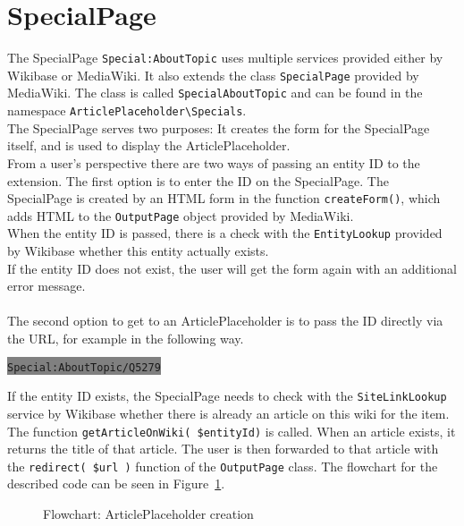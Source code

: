 \section{SpecialPage}

The SpecialPage \texttt{\justify Special:AboutTopic} uses multiple services provided either by Wikibase or MediaWiki. It also extends the class \texttt{\justify SpecialPage} provided by MediaWiki. The class is called \texttt{\justify SpecialAboutTopic} and can be found in the namespace \texttt{\justify ArticlePlaceholder\textbackslash{}Specials}. \\
The SpecialPage serves two purposes: It creates the form for the SpecialPage itself, and is used to display the ArticlePlaceholder. \\
From a user's perspective there are two ways of passing an entity ID to the extension. 
The first option is to enter the ID on the SpecialPage. The SpecialPage is created by an HTML form in the function \texttt{\justify createForm()}, which adds HTML to the \texttt{\justify OutputPage} object provided by MediaWiki. \\
When the entity ID is passed, there is a check with the \texttt{\justify EntityLookup} provided by Wikibase whether this entity actually exists. \\ 
If the entity ID does not exist, the user will get the form again with an additional error message. \\
\\
The second option to get to an ArticlePlaceholder is to pass the ID directly via the URL, for example in the following way.
\begin{center}
\colorbox{Gray}{\lstinline[basicstyle=\ttfamily\color{white}]|Special:AboutTopic/Q5279|}
\end{center}

If the entity ID exists, the SpecialPage needs to check with the \texttt{\justify SiteLinkLookup} service by Wikibase whether there is already an article on this wiki for the item. The function \texttt{\justify getArticleOnWiki( \$entityId)} is called. When an article exists, it returns the title of that article. The user is then forwarded to that article with the \texttt{\justify redirect( \$url )} function of the \texttt{\justify OutputPage} class.
The flowchart for the described code can be seen in Figure~\ref{fig:createpl}. 
\begin{figure}[H]
	\centering
	
	\caption{Flowchart: ArticlePlaceholder creation}
	\label{fig:createpl}
\end{figure}

